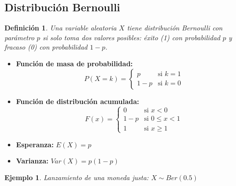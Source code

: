 \documentclass[landscape,twocolumn]{article}
\newtheorem{definition}[theorem]{Definición}
\newtheorem{example}{Ejemplo}[section]
\begin{document}
\subsection{Distribución Bernoulli}
\begin{definition}
Una variable aleatoria $X$ tiene distribución Bernoulli con parámetro $p$ si solo toma dos valores posibles: éxito (1) con probabilidad $p$ y fracaso (0) con probabilidad $1-p$.
\end{definition}

\begin{itemize}
    \item \textbf{Función de masa de probabilidad:}
    \[ P(X = k) = \begin{cases}
        p & \text{si } k = 1 \\
        1-p & \text{si } k = 0
    \end{cases} \]
    
    \item \textbf{Función de distribución acumulada:}
    \[ F(x) = \begin{cases}
        0 & \text{si } x < 0 \\
        1-p & \text{si } 0 \leq x < 1 \\
        1 & \text{si } x \geq 1
    \end{cases} \]
    
    \item \textbf{Esperanza:} $E(X) = p$
    
    \item \textbf{Varianza:} $Var(X) = p(1-p)$
\end{itemize}

\begin{example}
Lanzamiento de una moneda justa: $X \sim Ber(0.5)$
\end{example}

\begin{center}
\end{center}
\end{document}
